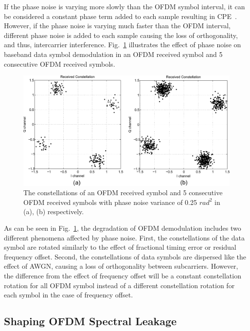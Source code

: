 If the phase noise is varying more slowly than the OFDM symbol interval, it can be considered a constant phase term added to each sample resulting in CPE~\cite{Armada1998}.
However, if the phase noise is varying much faster than the OFDM interval, different phase noise is added to each sample causing the loss of orthogonality, and thus, intercarrier interference.
Fig.~\ref{fig:phasenoise} illustrates the effect of phase noise on baseband data symbol demodulation in an OFDM received symbol and 5 consecutive OFDM received symbols.
\begin{figure}
	\centerline{\includegraphics [width=0.8\columnwidth] {Figures/phasenoise.pdf} }
	\caption{The constellations of an OFDM received symbol and 5 consecutive OFDM received symbols with phase noise variance of 0.25 $rad^2$ in (a), (b) respectively.}
	\label{fig:phasenoise}
\end{figure}

As can be seen in Fig.~\ref{fig:phasenoise}, the degradation of OFDM demodulation includes two different phenomena affected by phase noise.
First, the constellations of the data symbol are rotated similarly to the effect of fractional timing error or residual frequency offset.
Second, the constellations of data symbols are dispersed like the effect of AWGN, causing a loss of orthogonality between subcarriers.
However, the difference from the effect of frequency offset will be a constant constellation rotation for all OFDM symbol instead of a different constellation rotation for each symbol in the case of frequency offset.


\subsection{Shaping OFDM Spectral Leakage}
\label{Ch2:SpecLeak}

